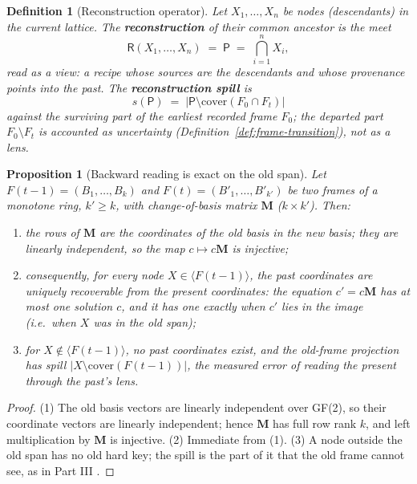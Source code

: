 \documentclass[11pt,a4paper]{article}
\newtheorem{definition}[principle]{Definition}
\newtheorem{proposition}[principle]{Proposition}
\theoremstyle{remark}
\newcommand{\spanof}[1]{\ensuremath{\langle #1\rangle}}  %
\newcommand{\cover}{\ensuremath{\mathrm{cover}}}         %
\newcommand{\Change}{\ensuremath{\mathbf{M}}}            %
\newcommand{\Recon}{\ensuremath{\mathsf{R}}}             %
\newcommand{\Proto}{\ensuremath{\mathsf{P}}}             %
\begin{document}
\begin{definition}[Reconstruction operator]
\label{def:recon}
Let $X_1,\dots,X_n$ be nodes (descendants) in the current lattice. The
\textbf{reconstruction} of their common ancestor is the meet
\[
  \Recon(X_1,\dots,X_n)
  \;=\;
  \Proto
  \;=\;
  \bigcap_{i=1}^n X_i,
\]
read as a \emph{view}: a recipe whose sources are the descendants and whose
provenance points into the past. The \textbf{reconstruction spill} is
\[
  s(\Proto) \;=\; |\Proto \setminus \cover(F_0 \cap F_t)|
\]
against the \emph{surviving} part of the earliest recorded frame $F_0$;
the departed part $F_0 \setminus F_t$ is accounted as uncertainty
(Definition~\ref{def:frame-transition}), not as a lens.
\end{definition}

\begin{proposition}[Backward reading is exact on the old span]
\label{prop:backward}
Let $F(t{-}1)=(B_1,\dots,B_k)$ and $F(t)=(B'_1,\dots,B'_{k'})$ be two frames
of a monotone ring, $k' \ge k$, with change-of-basis matrix $\Change$
($k \times k'$). Then:
\begin{enumerate}[leftmargin=*,nosep]
  \item the rows of $\Change$ are the coordinates of the old basis in the new
    basis; they are linearly independent, so the map
    $c \mapsto c\Change$ is injective;
  \item consequently, for every node $X \in \spanof{F(t{-}1)}$, the past
    coordinates are uniquely recoverable from the present coordinates: the
    equation $c' = c\Change$ has at most one solution $c$, and it has one
    exactly when $c'$ lies in the image (i.e.\ when $X$ was in the old
    span);
  \item for $X \notin \spanof{F(t{-}1)}$, no past coordinates exist, and the
    old-frame projection has spill
    $|X \setminus \cover(F(t{-}1))|$, the measured error of reading the
    present through the past's lens.
\end{enumerate}
\end{proposition}

\begin{proof}
(1) The old basis vectors are linearly independent over GF(2), so their
coordinate vectors are linearly independent; hence $\Change$ has full row
rank $k$, and left multiplication by $\Change$ is injective. (2) Immediate
from (1). (3) A node outside the old span has no old hard key; the spill is
the part of it that the old frame cannot see, as in Part III
\cite{part3,state2026}.
\end{proof}
\end{document}
